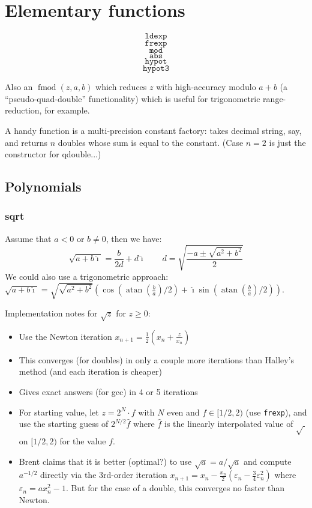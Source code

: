 \documentclass[10pt,dvipdfmx,letterpaper,twoside]{article}
\newcommand{\F}[1]{{\mathtt{#1}}}
\DeclareMathOperator{\atan}{atan}
\let\O=\operatorname
\newcommand{\ii}{{\hat{\imath}}}
\newenvironment{implementation}{\noindent\begin{framed}}{\end{framed}}
\let\eps=\varepsilon
\begin{document}
\section{Elementary functions}

\[\F{ldexp}\] \[\F{frexp}\] \[\F{mod}\] \[\F{abs}\] \[\F{hypot}\] \[\F{hypot3}\]

Also an $\O{fmod}(z,a,b)$ which reduces $z$ with high-accuracy modulo $a+b$ (a ``pseudo-quad-double'' functionality)
which is useful for trigonometric range-reduction, for example.

A handy function is a multi-precision constant factory: takes decimal string, say, and returns $n$ doubles whose sum
is equal to the constant.  (Case $n=2$ is just the constructor for qdouble...)

\subsection{Polynomials}

\subsubsection{sqrt}
Assume that $a<0$ or $b\neq0$, then we have:
\[ \sqrt{a+b\ii} = \frac{b}{2d} + d\ii \qquad d=\sqrt{\frac{-a\pm\sqrt{a^2+b^2}}{2}} \]
We could also use a trigonometric approach: $\sqrt{a+b\ii} = \sqrt{\sqrt{a^2+b^2}}\left(\cos(\atan(\tfrac{b}{a})/2) + \ii\sin(\atan(\tfrac{b}{a})/2)\right)$.

\begin{implementation}
Implementation notes for $\sqrt{z}$ for $z\geq0$:
\begin{itemize}
\item Use the Newton iteration $x_{n+1} = \frac12(x_n + \frac{z}{x_n})$
\item This converges (for doubles) in only a couple more iterations than Halley's method (and each iteration is cheaper)
\item Gives exact answers (for gcc) in 4 or 5 iterations
\item For starting value, let $z=2^N\cdot f$ with $N$ even and $f\in[1/2, 2)$ (use {\tt frexp}),
  and use the starting guess of $2^{N/2}\widehat{f}$ where $\widehat{f}$ is the linearly interpolated value of $\sqrt{\ }$ on $[1/2,2)$
  for the value $f$.
\item Brent claims that it is better (optimal?) to use $\sqrt{a} = a/\sqrt{a}$ and compute $a^{-1/2}$ directly via the 3rd-order iteration
  $x_{n+1} = x_n - \frac{x_n}{2}(\eps_n - \tfrac34 \eps_n^2)$ where $\eps_n = a x_n^2 - 1$.  But for the case of a double, this
  converges no faster than Newton.
\end{itemize}
\end{implementation}
\end{document}
